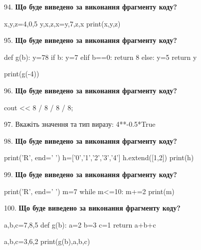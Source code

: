 \documentclass[11pt]{article}
\begin{document}
94. \textbf{Що буде виведено за виконання фрагменту коду?}

x,y,z=4,0,5
y,x,z,x=y,7,z,x
print(x,y,z)
\par\vspace{5mm}

95. \textbf{Що буде виведено за виконання фрагменту коду?}

def g(b):
    y=78
    if b: 
        y=7
    elif b==0:
         return 8
    else:
         y=5
    return y

print(g(-4))
\par\vspace{5mm}

96. \textbf{Що буде виведено за виконання фрагменту коду?}

cout << 8 / 8 / 8 / 8;
\par\vspace{5mm}

97. 
Вкажіть значення та тип виразу:
4**-0.5*True
\par\vspace{5mm}

98. \textbf{Що буде виведено за виконання фрагменту коду?}

print('R', end=' ')
h=['0','1','2','3','4']
h.extend([1,2])
print(h)

\par\vspace{5mm}

99. \textbf{Що буде виведено за виконання фрагменту коду?}

print('R', end=' ')
m=7
while m<=10:
    m+=2
print(m)

\par\vspace{5mm}

100. \textbf{Що буде виведено за виконання фрагменту коду?}

a,b,c=7,8,5
def g(b):
    a=2
    b=3
    c=1
    return a+b+c

a,b,c=3,6,2
print(g(b),a,b,c)
\par\vspace{5mm}

\newpage
\end{document}
